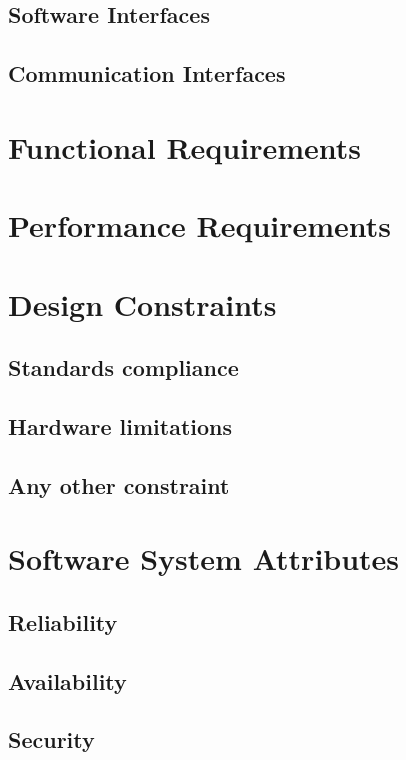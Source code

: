 \documentclass{Configuration_Files/PoliMi3i_thesis}
\begin{document}
\subsection{Software Interfaces}

\subsection{Communication Interfaces}

\section{Functional Requirements}

\section{Performance Requirements}

\section{Design Constraints}

\subsection{Standards compliance}

\subsection{Hardware limitations}

\subsection{Any other constraint}

\section{Software System Attributes}

\subsection{Reliability}

\subsection{Availability}

\subsection{Security}
\end{document}
